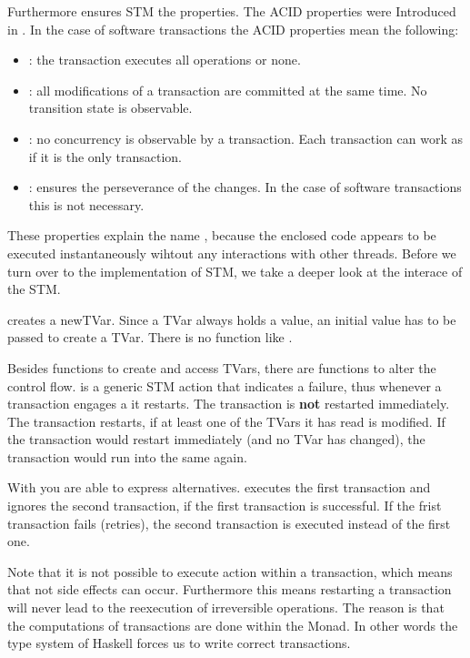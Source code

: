 Furthermore ensures STM the  properties. The ACID properties were Introduced in \parencite{DBTrans}.
In the case of software transactions the ACID properties mean the following:
\begin{itemize}
 \item {}: the transaction executes all operations or none.
 \item {}: all modifications of a transaction are committed at the same time. No transition state is observable.
 \item {}: no concurrency is observable by a transaction. Each transaction can work as if it is the only transaction.
 \item {}: ensures the perseverance of the changes. In the case of software transactions this is not necessary.
\end{itemize}
These properties explain the name , because the enclosed code appears to be executed instantaneously wihtout any 
interactions with other threads.
Before we turn over to the implementation of STM, we take a deeper look at the interace of the STM.

 creates a newTVar. Since a TVar always holds a value, an initial value has to be
passed to create a TVar. There is no function like . 

Besides functions to create and access TVars, there are functions to alter the control flow.
 is a generic STM action that indicates a failure, thus whenever a transaction engages a  it restarts. The transaction
is \textbf{not} restarted immediately. The transaction restarts, if at least one of the TVars it has read is modified. If the transaction would
restart immediately (and no TVar has changed), the transaction would run into the same  again. 

With  you are able to express alternatives.  executes the first transaction
and ignores the second transaction, if the first transaction is successful. If the frist transaction fails (retries), the second transaction is 
executed instead of the first one.

Note that it is not possible to execute  action within a transaction, which means that not side effects can occur. Furthermore this means
restarting a transaction will never lead to the reexecution of irreversible operations. The reason is that the computations of transactions
are done within the  Monad. In other words the type system of Haskell forces us to write correct transactions. 

